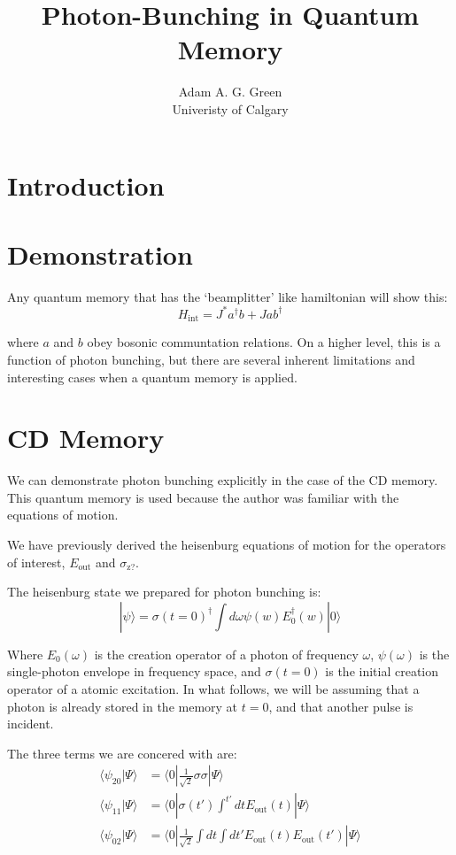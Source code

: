 \documentclass[12pt]{article}
\title{Photon-Bunching in Quantum Memory}
\author{Adam A. G. Green\\Univeristy of Calgary}
\begin{document}

\maketitle
\section{Introduction}
\doublespacing
\section{Demonstration}

Any quantum memory that has the `beamplitter' like hamiltonian will show this:
\begin{equation}
H_{\textrm{int}}= J^* a^\dagger b + J a b^\dagger
\end{equation}

where $a$ and $b$ obey bosonic communtation relations. On a higher level, this is a function of photon bunching, but there are several inherent limitations and interesting cases when a quantum memory is applied.

\section{CD Memory}
We can demonstrate photon bunching explicitly in the case of the CD memory\cite{arxiv}. This quantum memory is used because the author was familiar with the equations of motion.

We have previously derived the heisenburg equations of motion for the operators of interest, $E_{\textrm{out}}$ and $\sigma_{\textrm{z?}}$.

The heisenburg state we prepared for photon bunching is:
\begin{equation}
| \psi \rangle = \sigma(t=0)^\dagger \int d\omega \psi(w) E_0^\dagger(w) | 0 \rangle
\end{equation}

Where $E_0(\omega)$ is the creation operator of a photon of frequency $\omega$, $\psi(\omega)$ is the single-photon envelope in frequency space, and $\sigma(t=0)$ is the initial creation operator of a atomic excitation. In what follows, we will be assuming that a photon is already stored in the memory at $t=0$, and that another pulse is incident.

The three terms we are concered with are:
\begin{align}
\langle \psi_{20}| \Psi \rangle &=\langle 0 | \frac{1}{\sqrt{2}}\sigma \sigma | \Psi \rangle\\
\langle \psi_{11} | \Psi \rangle& =\langle 0 |  \sigma(t') \int^{t'} dt E_\textrm{out}(t) | \Psi \rangle\\
\langle \psi_{02} | \Psi \rangle &= \langle 0 |  \frac{1}{\sqrt{2}}\int dt \int dt' E_\textrm{out}(t) E_\textrm{out}(t') | \Psi \rangle
\end{align}
\end{document}

